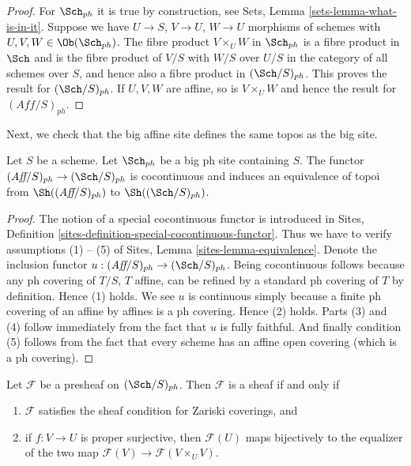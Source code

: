 \begin{proof}
For $\Sch_{ph}$ it is true by construction, see
Sets, Lemma \ref{sets-lemma-what-is-in-it}.
Suppose we have $U \to S$, $V \to U$, $W \to U$ morphisms
of schemes with $U, V, W \in \Ob(\Sch_{ph})$.
The fibre product $V \times_U W$ in $\Sch_{ph}$
is a fibre product in $\Sch$ and
is the fibre product of $V/S$ with $W/S$ over $U/S$ in
the category of all schemes over $S$, and hence also a
fibre product in $(\Sch/S)_{ph}$.
This proves the result for $(\Sch/S)_{ph}$.
If $U, V, W$ are affine, so is $V \times_U W$ and hence the
result for $(\textit{Aff}/S)_{ph}$.
\end{proof}

\noindent
Next, we check that the big affine site defines the same
topos as the big site.

\begin{lemma}
\label{lemma-affine-big-site-ph}
Let $S$ be a scheme. Let $\Sch_{ph}$ be a big ph
site containing $S$.
The functor $(\textit{Aff}/S)_{ph} \to (\Sch/S)_{ph}$
is cocontinuous and induces an equivalence of topoi from
$\Sh((\textit{Aff}/S)_{ph})$ to
$\Sh((\Sch/S)_{ph})$.
\end{lemma}

\begin{proof}
The notion of a special cocontinuous functor is introduced in
Sites, Definition \ref{sites-definition-special-cocontinuous-functor}.
Thus we have to verify assumptions (1) -- (5) of
Sites, Lemma \ref{sites-lemma-equivalence}.
Denote the inclusion functor
$u : (\textit{Aff}/S)_{ph} \to (\Sch/S)_{ph}$.
Being cocontinuous follows because any ph covering of
$T/S$, $T$ affine, can be refined by a standard ph covering of $T$
by definition. Hence (1) holds. We see $u$ is continuous simply
because a finite ph covering of an affine by affines is a ph covering.
Hence (2) holds.
Parts (3) and (4) follow immediately from the fact that $u$ is
fully faithful. And finally condition (5) follows from the
fact that every scheme has an affine open covering (which is
a ph covering).
\end{proof}

\begin{lemma}
\label{lemma-characterize-sheaf}
Let $\mathcal{F}$ be a presheaf on $(\Sch/S)_{ph}$.
Then $\mathcal{F}$ is a sheaf if and only if
\begin{enumerate}
\item $\mathcal{F}$ satisfies the sheaf condition for
Zariski coverings, and
\item if $f : V \to U$ is proper surjective, then
$\mathcal{F}(U)$ maps bijectively to the equalizer
of the two map $\mathcal{F}(V) \to \mathcal{F}(V \times_U V)$.
\end{enumerate}
\end{lemma}

